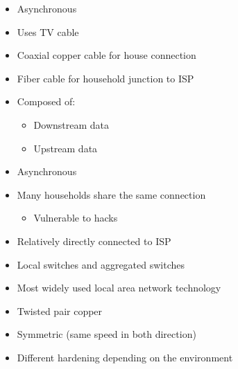 \begin{itemize}
\begin{itemize}
\begin{itemize}
                        \item Asynchronous
                    \end{itemize}
                    \begin{itemize}
                        \item Uses TV cable
                        \item Coaxial copper cable for house connection
                        \item Fiber cable for household junction to ISP
                        \item Composed of:
                            \begin{itemize}
                                \item Downstream data
                                \item Upstream data
                            \end{itemize}
                        \item Asynchronous
                        \item Many households share the same connection
                            \begin{itemize}
                                \item Vulnerable to hacks
                            \end{itemize}
                    \end{itemize}
                    \begin{itemize}
                        \item Relatively directly connected to ISP
                        \item Local switches and aggregated switches
                    \end{itemize}
                    \begin{itemize}
                        \item Most widely used local area network technology
                        \item Twisted pair copper
                        \item Symmetric (same speed in both direction)
                    \end{itemize}
                    \begin{itemize}
                        \item Different hardening depending on the environment

\end{itemize}
\end{itemize}
\end{itemize}
